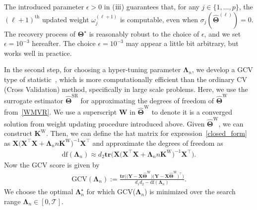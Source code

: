 \documentclass[12pt]{article}
\newcommand{\RN}[1]{%
  \textup{\uppercase\expandafter{\romannumeral#1}}%
}
\begin{document}
The introduced parameter $\epsilon>0$ in ($\RN{3}$) guarantees that, for any $j\in\{1,\dots,p\}$,  
the $(\ell+1)^{\text{th}}$ updated weight $\omega_{j}^{(\ell+1)}$ is computable, even when $\sigma_{j}(\widehat{\boldsymbol{\Theta}}^{(\ell)})=0$.
The recovery process of $\boldsymbol{\Theta}^{\star}$ is reasonably robust to the choice of $\epsilon$, and we set $\epsilon=10^{-3}$ hereafter.
The choice $\epsilon=10^{-3}$ may appear a little bit arbitrary, but works well in practice.

In the second step, for choosing a hyper-tuning parameter $\boldsymbol{\Lambda}_{n}$, we develop a GCV type of statistic~\citep{golub1979generalized}, which is more computationally efficient than the ordinary CV (Cross Validation) method, specifically in large scale problems.
Here, we use the surrogate estimator $\widehat{\boldsymbol{\Theta}}^{\text{SR}}$ for approximating the degrees of freedom of $\widehat{\boldsymbol{\Theta}}^{\text{W}}$ from~\eqref{WMVR}. 
We use a superscript $\boldsymbol{\text{W}}$ in $\widehat{\boldsymbol{\Theta}}^{\text{W}}$ to denote it is a converged solution from weight updating procedure introduced above.
Given $\widehat{\boldsymbol{\Theta}}^{\text{W}}$, we can construct $\boldsymbol{K}^{\text{W}}$.
Then, we can define the hat matrix for expression~\eqref{closed_form} as $\boldsymbol{X} \big(\boldsymbol{X}^{\top}\boldsymbol{X}+\boldsymbol{\Lambda}_{n}n\boldsymbol{K}^{\text{W}}\big)^{-1}\boldsymbol{X}^{\top}$ and approximate the degrees of freedom as 
\begin{align}
    \text{df}(\boldsymbol{\Lambda}_{n}) \approx d_{2} \textbf{tr}\big(\boldsymbol{X} \big(\boldsymbol{X}^{\top}\boldsymbol{X}+\boldsymbol{\Lambda}_{n}n\boldsymbol{K}^{\text{W}}\big)^{-1}\boldsymbol{X}^{\top}\big).
\end{align}
Now the GCV score is given by
\begin{align} \label{GCV}
    \text{GCV}(\boldsymbol{\Lambda}_{n}) := \frac{\textbf{tr}\big(\big(\boldsymbol{Y}-\boldsymbol{X}\widehat{\boldsymbol{\Theta}}^{\text{W}}\big)\big(\boldsymbol{Y}-\boldsymbol{X}\widehat{\boldsymbol{\Theta}}^{\text{W}}\big)^{\top}\big)}{d_{1}d_{2}-\text{df}(\boldsymbol{\Lambda}_{n})}.
\end{align}
We choose the optimal $\boldsymbol{\Lambda}_{n}^{\star}$ for which GCV($\boldsymbol{\Lambda}_{n}$) is minimized over the search range $\boldsymbol{\Lambda}_{n}\in [0,\mathcal{T}]$.
\end{document}
